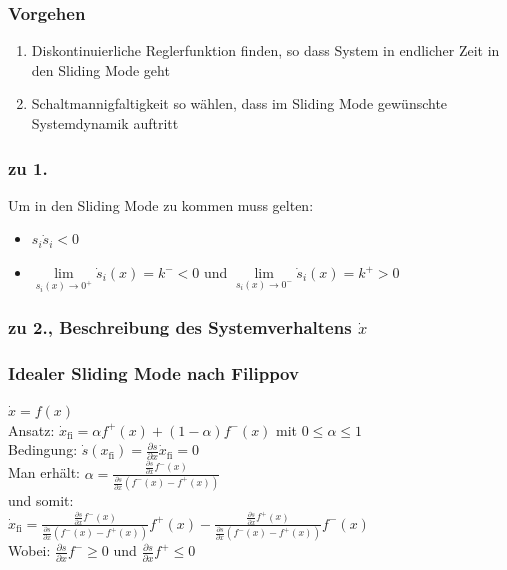 \documentclass[german]{latex4ei/latex4ei_sheet}
\begin{document}
\subsubsection*{Vorgehen}
\begin{enumerate}
  \item Diskontinuierliche Reglerfunktion finden, so dass System in endlicher Zeit in den Sliding Mode geht
  \item Schaltmannigfaltigkeit so wählen, dass im Sliding Mode gewünschte Systemdynamik auftritt
\end{enumerate}

\subsubsection*{zu 1.}
Um in den Sliding Mode zu kommen muss gelten:
\begin{itemize}
  \item $s_i \dot{s}_i < 0$
  \item $\lim\limits_{s_i(x) \rightarrow 0^+} \dot{s}_i(x) = k^- < 0$ und $\lim\limits_{s_i(x) \rightarrow 0^-} \dot{s}_i(x) = k^+ > 0$
\end{itemize}

\subsubsection*{zu 2., Beschreibung des Systemverhaltens $\dot{x}$}

\subsubsection*{Idealer Sliding Mode nach Filippov}
$\dot{x} = f(x)$\\
Ansatz: $\dot{x}_\text{fi} = \alpha f^+(x) + (1-\alpha) f^-(x)$ mit $0 \leq \alpha \leq 1$ \\
Bedingung: $\dot{s}(x_\text{fi}) = \frac{\partial s}{\partial x} \dot{x}_\text{fi} = 0$ \\
Man erhält: $\alpha = \frac{ \frac{\partial s}{\partial x} f^-(x)  }{ \frac{\partial s}{\partial x} (f^-(x) - f^+(x))  }$ \\
und somit:\\ $\dot{x}_\text{fi} = \frac{ \frac{\partial s}{\partial x} f^-(x)  }{ \frac{\partial s}{\partial x} (f^-(x) - f^+(x)) } f^+(x) -
\frac{ \frac{\partial s}{\partial x} f^+(x)  }{ \frac{\partial s}{\partial x} (f^-(x) - f^+(x)) } f^-(x)$ \\
Wobei: $\frac{\partial s}{\partial x}f^- \geq 0$ und $\frac{\partial s}{\partial x}f^+ \leq 0$ \\
\end{document}
